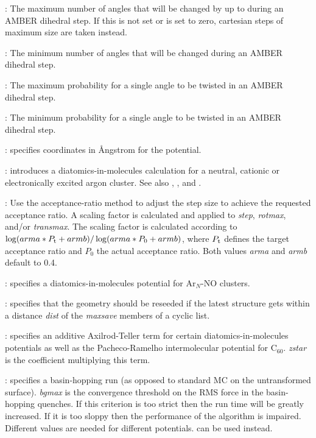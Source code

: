 : The maximum number of angles that will be changed by up to {\/} during an 
AMBER dihedral step. If this is not set or is set to zero, cartesian steps of maximum size {\/} are taken 
instead. 

: The minimum number of angles that will be changed during an AMBER dihedral step.

: The maximum probability for a single angle to be twisted in an AMBER dihedral step.

: The minimum probability for a single angle to be twisted in an AMBER dihedral step.

: specifies coordinates in \AA ngstrom for the {\/}
potential.

: introduces a diatomics-in-molecules calculation for
a neutral, cationic or electronically excited argon cluster. See also
{\/}, {\/}, {\/} and {\/}.

: Use the acceptance-ratio method 
\cite{Bouzida92} to adjust the step size to achieve the requested 
acceptance ratio. A scaling factor is calculated and applied to {\it step}, {\it rotmax},
and/or {\it transmax}. The scaling factor is calculated according to 
$\log(arma*P_{\rm t}+armb)/\log(arma*P_0+armb)$, where $P_{\rm t}$ defines the
target acceptance ratio and $P_0$ the actual acceptance ratio. Both values {\it arma} and
{\it armb} default to 0.4.

: specifies a diatomics-in-molecules potential for Ar$_N$-NO clusters.

: specifies that the geometry should be reseeded if the
latest structure gets within a distance {\it dist} of the {\it maxsave} members of a
cyclic list.

: specifies an additive Axilrod-Teller term for certain
diatomics-in-molecules potentials as well as the Pacheco-Ramelho intermolecular potential for
C$_{60}$.\cite{pachecor97} 
{\it zstar\/} is the coefficient multiplying this term.

: specifies a basin-hopping run (as opposed to standard MC
on the untransformed surface). {\it bgmax\/} is the convergence threshold
on the RMS force in the basin-hopping
quenches. If this criterion is too strict then the run time will be greatly increased.
If it is too sloppy then the performance of the algorithm is impaired. Different values
are needed for different potentials.  can be used instead.

